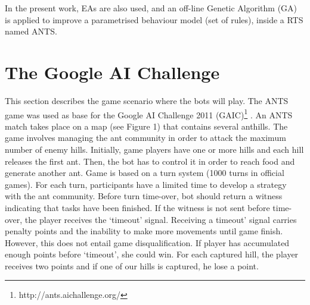 \documentclass[runningheads]{llncs}
\begin{document}

In the present work, EAs are also used, and an off-line Genetic Algorithm (GA) is applied to improve a parametrised behaviour model (set of rules), inside a RTS named ANTS.



\section{The Google AI Challenge}

This section describes the game scenario where the bots will play. The ANTS game was used as base for the Google AI Challenge 2011
 (GAIC)\footnote{http://ants.aichallenge.org/} \cite{holdum2011google}. An ANTS match takes place on a map (see Figure 1) %
that contains several anthills. The game involves managing the ant community in order to attack the maximum number of enemy hills. Initially, game players have one or more hills and each hill releases the first ant. Then, the bot has to control it in order to reach food and generate another ant. Game is based on a turn system (1000 turns in official games). For each turn, participants have a limited time to develop a strategy with the ant community. Before turn time-over, bot should return a witness indicating that tasks have been finished. If the witness is not sent before time-over, the player receives the `timeout' signal. Receiving a timeout' signal carries penalty points and the inability to make more movements until game finish. However, this does not entail game disqualification. If player has accumulated enough points before ‘timeout’, she could win. For each captured hill, the player receives two points and if one of our hills is captured, he lose a point.


\end{document}
